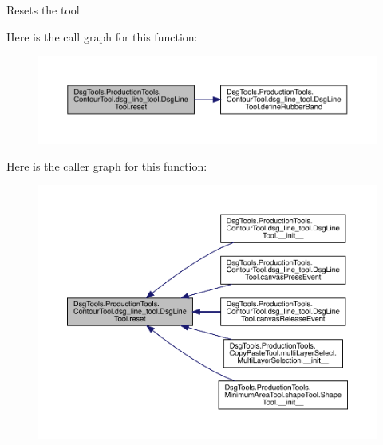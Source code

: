 \begin{DoxyVerb}Resets the tool
\end{DoxyVerb}
 Here is the call graph for this function\+:
\nopagebreak
\begin{figure}[H]
\begin{center}
\leavevmode
\includegraphics[width=350pt]{class_dsg_tools_1_1_production_tools_1_1_contour_tool_1_1dsg__line__tool_1_1_dsg_line_tool_a71aed4c442ef705084b8ca8193d60a24_cgraph}
\end{center}
\end{figure}
Here is the caller graph for this function\+:
\nopagebreak
\begin{figure}[H]
\begin{center}
\leavevmode
\includegraphics[width=350pt]{class_dsg_tools_1_1_production_tools_1_1_contour_tool_1_1dsg__line__tool_1_1_dsg_line_tool_a71aed4c442ef705084b8ca8193d60a24_icgraph}
\end{center}
\end{figure}
\mbox{\label{class_dsg_tools_1_1_production_tools_1_1_contour_tool_1_1dsg__line__tool_1_1_dsg_line_tool_a72b2e8b035c640968acceefb07f61bc9}} 
